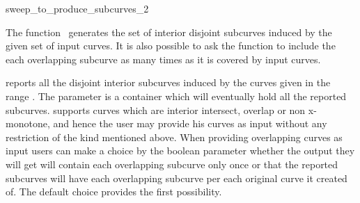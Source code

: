 

\begin{ccRefFunction}{sweep_to_produce_subcurves_2}  %


\ccDefinition

The function \ccRefName\ generates the set of interior disjoint
subcurves induced by the given set of input curves. It is also
possible to ask the function to include the each overlapping subcurve
as many times as it is covered by input curves.

\def\ccLongParamLayout{\ccTrue} 

   {reports all the disjoint interior subcurves induced by the curves
   given in the range \ccStyle{[curves_begin, curves_end)}. The
   parameter  is a container which will eventually
   hold all the reported
   subcurves.  supports
   curves which are interior intersect, overlap or non x-monotone, and
   hence the user may provide his curves as input without any
   restriction of the kind mentioned above. When providing overlapping
   curves as input users can make a choice by the boolean parameter
    whether the output they will get will contain
   each overlapping subcurve only once or that the reported subcurves
   will have each overlapping subcurve per each original curve it
   created of. The default choice provides the first possibility.}

\ccSeeAlso

 \\


\end{ccRefFunction}
